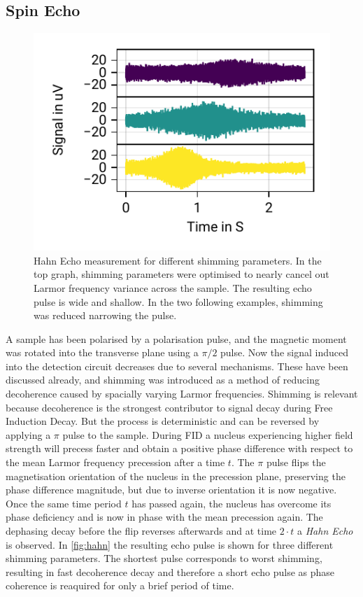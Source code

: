 \documentclass[
    parskip=half, 
    twoside=false,
    twocolumn=true,
    fontsize=11pt,
]{scrarticle}
\begin{document}
\subsection{Spin Echo}
\begin{figure}
    \centering
    \label{fig:hahn}
    \includegraphics{figures/04 spin echo shims.pdf}
    \caption{Hahn Echo measurement for different shimming parameters. In the top graph, shimming parameters were optimised to nearly cancel out Larmor frequency variance across the sample. The resulting echo pulse is wide and shallow. In the two following examples, shimming was reduced narrowing the pulse.}
\end{figure}
A sample has been polarised by a polarisation pulse, and the magnetic moment was rotated into the transverse plane using a $\pi/2$ pulse. Now the signal induced into the detection circuit decreases due to several mechanisms. These have been discussed already, and shimming was introduced as a method of reducing decoherence caused by spacially varying Larmor frequencies. Shimming is relevant because decoherence is the strongest contributor to signal decay during Free Induction Decay. But the process is deterministic and can be reversed by applying a $\pi$ pulse to the sample. During FID a nucleus experiencing higher field strength will precess faster and obtain a positive phase difference with respect to the mean Larmor frequency precession after a time $t$. The $\pi$ pulse flips the magnetisation orientation of the nucleus in the precession plane, preserving the phase difference magnitude, but due to inverse orientation it is now negative. Once the same time period $t$ has passed again, the nucleus has overcome its phase deficiency and is now in phase with the mean precession again. The dephasing decay before the flip reverses afterwards and at time $2\cdot t$ a \textit{Hahn Echo} is observed. In \autoref{fig:hahn} the resulting echo pulse is shown for three different shimming parameters. The shortest pulse corresponds to worst shimming, resulting in fast decoherence decay and therefore a short echo pulse as phase coherence is reaquired for only a brief period of time.
\end{document}
